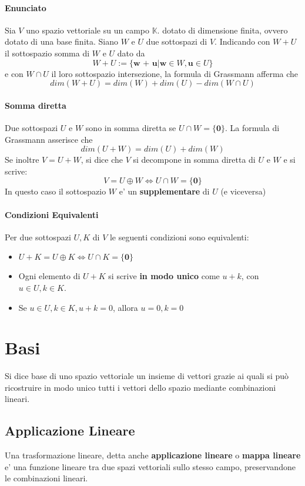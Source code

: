 \documentclass[a4paper, 10pt]{article}
\begin{document}
	\paragraph*{Enunciato}
	Sia $V$ uno spazio vettoriale su un campo $\mathbb{K}$. dotato di dimensione finita, 
	ovvero dotato di una base finita. Siano $W$ e $U$ due sottospazi di $V$. 
	Indicando con $W + U$ il sottospazio somma di $W$ e $U$ dato da 
	\[ W + U := \lbrace \textbf{w + u} \vert \textbf{w} \in W, \textbf{u} \in U \rbrace \]
	e con $W \cap U$ il loro sottospazio intersezione, la formula di Grassmann afferma che 
	\[ dim(W + U) = dim(W) + dim(U) - dim(W \cap U) \]
	\paragraph*{Somma diretta}
	Due sottospazi $U$ e $W$ sono in somma diretta se $U \cap W = \lbrace \textbf{0} \rbrace $. 
	La formula di Grassmann asserisce che 
	\[ dim(U + W) = dim(U) + dim(W) \]
	Se inoltre $V = U + W$, si dice che $V$ si decompone in somma diretta di $U$ e $W$ e si scrive:
	\[ V = U \oplus W  \Leftrightarrow U \cap W = \lbrace \textbf{0} \rbrace \]
	In questo caso il sottospazio $W$ e' un \textbf{supplementare} di $U$ (e viceversa)
	\paragraph*{Condizioni Equivalenti} Per due sottospazi $U,K$ di $V$ le seguenti condizioni sono equivalenti:
	\begin{itemize}
		\item $U + K = U \oplus K \Leftrightarrow U \cap K = \lbrace \textbf{0} \rbrace$
		\item Ogni elemento di $U + K$ si scrive \textbf{in modo unico} come $u + k$, con $u \in U, k \in K$.
		\item Se $u \in U, k \in K, u + k = 0$, allora $u = 0, k = 0$
	\end{itemize}
	
	\newpage
	\section{Basi}
	Si dice base di uno spazio vettoriale un insieme di vettori grazie ai quali si può ricostruire in modo unico tutti i vettori dello spazio mediante combinazioni lineari. 
	\subsection{Applicazione Lineare}
	Una trasformazione lineare, detta anche \textbf{applicazione lineare} o \textbf{mappa lineare} e' una
	funzione lineare tra due spazi vettoriali sullo stesso campo, preservandone le combinazioni lineari.
\end{document}

